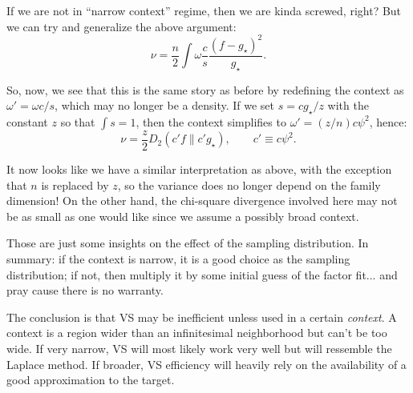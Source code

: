 \documentclass{article}
\begin{document}
If we are not in ``narrow context'' regime, then we are kinda screwed, right? But we can try and generalize the above argument:
$$
\nu = \frac{n}{2}\int \omega \frac{c}{s} \frac{(f-g_\star)^2}{g_\star}
.
$$

So, now, we see that this is the same story as before by redefining the context as $\omega'=\omega c / s$, which may no longer be a density. If we set $s=c g_\star/z$ with the constant $z$ so that $\int s = 1$, then the context simplifies to $\omega'=(z/n) c \psi^2$, hence:
$$
\nu = \frac{z}{2} D_2(c' f\| c' g_\star),
\qquad
c' \equiv c\psi^2
.
$$

It now looks like we have a similar interpretation as above, with the exception that $n$ is replaced by $z$, so the variance does no longer depend on the family dimension! On the other hand, the chi-square divergence involved here may not be as small as one would like since we assume a possibly broad context. 

Those are just some insights on the effect of the sampling distribution. In summary: if the context is narrow, it is a good choice as the sampling distribution; if not, then multiply it by some initial guess of the factor fit... and pray cause there is no warranty.

The conclusion is that VS may be inefficient unless used in a certain {\em context}. A context is a region wider than an infinitesimal neighborhood but can't be too wide. If very narrow, VS will most likely work very well but will ressemble the Laplace method. If broader, VS efficiency will heavily rely on the availability of a good approximation to the target. 




\end{document}
